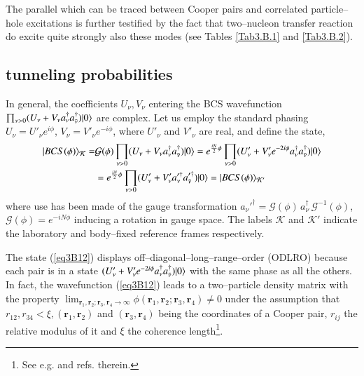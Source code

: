 \begin{subappendices}
    
 The parallel which can be traced between Cooper pairs and correlated particle--hole excitations is further testified by the fact that two--nucleon transfer reaction do excite quite strongly also these modes (see Tables \ref{Tab3.B.1} and \ref{Tab3.B.2}). 

 \subsection{tunneling probabilities}
 In general, the coefficients $U_\nu,V_\nu$ entering the BCS wavefunction $\prod_{\nu>0}(U_\nu+V_\nu a_\nu^\dagger a_{\bar{\nu}}^\dagger)|{0} \rangle$ are complex. Let us employ the standard phasing $U_\nu=U'_\nu e^{i\phi}$, $V_\nu=V'_\nu e^{-i\phi}$, where $U'_\nu$ and $V'_\nu$ are real, and define the state,
 \begin{align}\label{eq3B12}
\nonumber |{BCS(\phi)} \rangle_{\mathcal K}=&\mathcal G(\phi) \prod_{\nu>0}(U_\nu+V_\nu a_\nu^\dagger a_{\bar{\nu}}^\dagger)|{0} \rangle=e^{\frac{iN}{2}\phi}\prod_{\nu>0}(U'_\nu+V'_\nu e^{-2i\phi} a_\nu^\dagger a_{\bar{\nu}}^\dagger)|{0} \rangle\\
&=e^{\frac{iN}{2}\phi}\prod_{\nu>0}(U'_\nu+V'_\nu  a_\nu'^\dagger a_{\bar{\nu}}'^\dagger)|{0} \rangle=|{BCS(\phi)} \rangle_{\mathcal K'}
 \end{align}  
 where use has been made of the gauge transformation $a_\nu'^\dagger=\mathcal G(\phi)\,a_\nu^\dagger\,\mathcal G^{-1}(\phi)$, $\mathcal G(\phi)=e^{-iN\phi}$ inducing a rotation in gauge space. The labels $\mathcal K$ and $\mathcal K'$ indicate the laboratory and body--fixed reference frames respectively.
 
 
 The state (\ref{eq3B12}) displays off--diagonal--long--range--order (ODLRO) because each pair is in a state $(U'_\nu+V'_\nu e^{-2i\phi} a_\nu^\dagger a_{\bar{\nu}}^\dagger)|{0} \rangle$ with the same phase as all the others. In fact, the wavefunction (\ref{eq3B12}) leads to a two--particle density matrix with the property $\lim_{\mathbf r_1, \mathbf r_2;\mathbf r_3, \mathbf r_4\rightarrow\infty}\phi(\mathbf r_1, \mathbf r_2;\mathbf r_3, \mathbf r_4)\neq 0$ under the assumption that $r_{12}, r_{34}<\xi, (\mathbf r_1, \mathbf r_2)$ and $(\mathbf r_3, \mathbf r_4)$ being the coordinates of a Cooper pair, $r_{ij}$ the relative modulus of it and $\xi$ the coherence length\footnote{See e.g. \cite{Ambegaokar:69} and refs. therein.}.
 

\end{subappendices}
